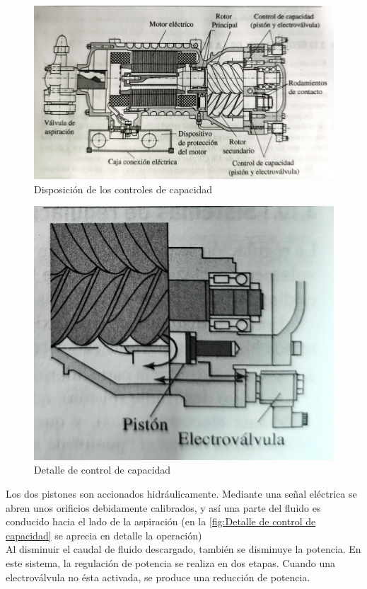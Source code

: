 \begin{figure}[H]
	\centering
	\includegraphics[width=\textwidth]{figuras/compresores/controles de capacidad.jpg}
	\caption{Disposici\'on de los controles de capacidad}
	\label{fig:Disposici\'on de los controles de capacidad}
\end{figure}

\begin{figure}
	\centering
	\includegraphics[width=.7\linewidth]{figuras/compresores/detalle de control de capacidad.jpg}
	\caption{Detalle de control de capacidad}
	\label{fig:Detalle de control de capacidad}
\end{figure}

Los dos pistones son accionados hidr\'aulicamente. Mediante una señal el\'ectrica se abren unos orificios debidamente calibrados, y as\'i una parte del fluido es conducido hacia el lado de la aspiraci\'on (en la \autoref{fig:Detalle de control de capacidad} se aprecia en detalle la operaci\'on)\\Al disminuir el caudal de fluido descargado, tambi\'en se disminuye la potencia. En este sistema, la regulaci\'on de potencia se realiza en dos etapas. Cuando una electrov\'alvula no \'esta activada, se produce una reducci\'on de potencia.

